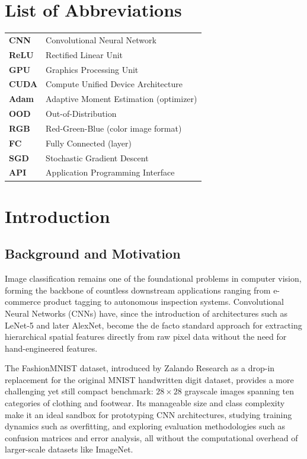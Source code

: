 \documentclass[12pt,a4paper]{report}
\begin{document}
\chapter*{List of Abbreviations}
\begin{tabular}{@{}ll@{}}
\textbf{CNN} & Convolutional Neural Network \\
\textbf{ReLU} & Rectified Linear Unit \\
\textbf{GPU} & Graphics Processing Unit \\
\textbf{CUDA} & Compute Unified Device Architecture \\
\textbf{Adam} & Adaptive Moment Estimation (optimizer) \\
\textbf{OOD} & Out-of-Distribution \\
\textbf{RGB} & Red-Green-Blue (color image format) \\
\textbf{FC} & Fully Connected (layer) \\
\textbf{SGD} & Stochastic Gradient Descent \\
\textbf{API} & Application Programming Interface \\
\end{tabular}

\clearpage
{}

\chapter{Introduction}

\section{Background and Motivation}
Image classification remains one of the foundational problems in computer vision, forming the backbone of countless downstream applications ranging from e-commerce product tagging to autonomous inspection systems. Convolutional Neural Networks (CNNs) have, since the introduction of architectures such as LeNet-5 and later AlexNet, become the de facto standard approach for extracting hierarchical spatial features directly from raw pixel data without the need for hand-engineered features.

The FashionMNIST dataset, introduced by Zalando Research as a drop-in replacement for the original MNIST handwritten digit dataset, provides a more challenging yet still compact benchmark: $28 \times 28$ grayscale images spanning ten categories of clothing and footwear. Its manageable size and class complexity make it an ideal sandbox for prototyping CNN architectures, studying training dynamics such as overfitting, and exploring evaluation methodologies such as confusion matrices and error analysis, all without the computational overhead of larger-scale datasets like ImageNet.
\end{document}
